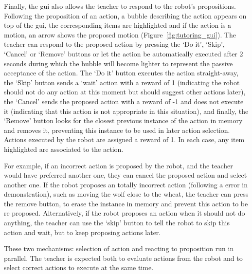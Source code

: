Finally, the \gls{gui} also allows the teacher to respond to the robot's propositions. Following the proposition of an action, a bubble describing the action appears on top of the \gls{gui}, the corresponding items are highlighted and if the action is a motion, an arrow shows the proposed motion (Figure~\ref{fig:tutoring_gui}). The teacher can respond to the proposed action by pressing the `Do it', `Skip', `Cancel' or `Remove' buttons or let the action be automatically executed after 2 seconds during which the bubble will become lighter to represent the passive acceptance of the action. The `Do it' button executes the action straight-away, the `Skip' button sends a `wait' action with a reward of 1 (indicating the robot should not do any action at this moment but should suggest other actions later), the `Cancel' sends the proposed action with a reward of -1 and does not execute it (indicating that this action is not appropriate in this situation), and finally, the `Remove' button looks for the closest previous instance of the action in memory and removes it, preventing this instance to be used in later action selection. Actions executed by the robot are assigned a reward of 1. In each case, any item highlighted are associated to the action. 

For example, if an incorrect action is proposed by the robot, and the teacher would have preferred another one, they can cancel the proposed action and select another one. If the robot proposes an totally incorrect action (following a error in demonstration), such as moving the wolf close to the wheat, the teacher can press the remove button, to erase the instance in memory and prevent this action to be re proposed. Alternatively, if the robot proposes an action when it should not do anything, the teacher can use the `skip' button to tell the robot to skip this action and wait, but to keep proposing actions later.

These two mechanisms: selection of action and reacting to proposition run in parallel. The teacher is expected both to evaluate actions from the robot and to select correct actions to execute at the same time.

